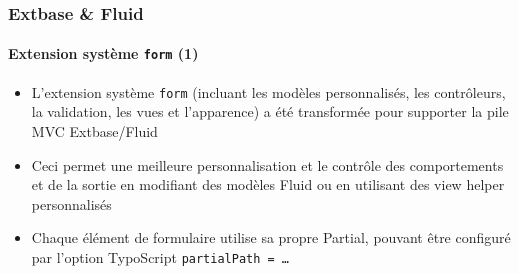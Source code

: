 \begin{frame}[fragile]
	\frametitle{Extbase \& Fluid}
	\framesubtitle{Extension système \texttt{form} (1)}

	\begin{itemize}

		\item L'extension système \texttt{form} (incluant les modèles personnalisés, les contrôleurs,
			la validation, les vues et l'apparence) a été transformée pour supporter la pile MVC
			Extbase/Fluid

		\item Ceci permet une meilleure personnalisation et le contrôle des comportements et de
			la sortie en modifiant des modèles Fluid ou en utilisant des view helper personnalisés

		\item Chaque élément de formulaire utilise sa propre Partial, pouvant être configuré
			par l'option TypoScript \texttt{partialPath = …}

	\end{itemize}

\end{frame}


